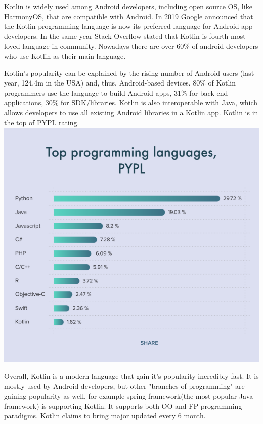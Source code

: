Kotlin is widely used among Android developers, including open source OS, like HarmonyOS, that are compatible with Android. In 2019 Google announced that the Kotlin programming language is now its preferred language for Android app developers. In the same year Stack Overflow stated that Kotlin is fourth most loved language in community. Nowadays there are over 60\% of android developers who use Kotlin as their main language. 
\par Kotlin's popularity can be explained by the rising number of Android users (last year, 124.4m in the USA) and, thus, Android-based devices. 80\% of Kotlin programmers use the language to build Android apps, 31\% for back-end applications, 30\% for SDK/libraries.
Kotlin is also interoperable with Java, which allows developers to use all existing Android libraries in a Kotlin app. Kotlin is in the top of PYPL rating.
\newline
\includegraphics[scale =0.65]{wp/pictures/kotlinRating.png}
\newline
\par Overall, Kotlin is a modern language that gain it's popularity incredibly fast. It is mostly used by Android developers, but other "branches of programming" are gaining popularity as well, for example spring framework(the most popular Java framework) is supporting Kotlin. It supports both OO and FP programming paradigms. Kotlin claims to bring major updated every 6 month.